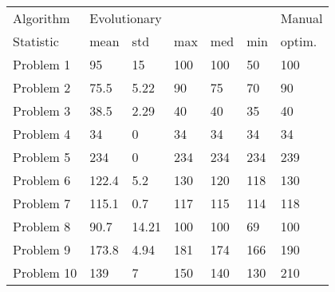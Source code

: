 \begin{tabular}{lllllll}
\toprule
Algorithm & \multicolumn{5}{l}{Evolutionary} & Manual \\
Statistic &         mean &    std &  max &  med &  min & optim. \\
\midrule
Problem 1  &           95 &     15 &  100 &  100 &   50 &    100 \\
Problem 2  &         75.5 &   5.22 &   90 &   75 &   70 &     90 \\
Problem 3  &         38.5 &   2.29 &   40 &   40 &   35 &     40 \\
Problem 4  &           34 &      0 &   34 &   34 &   34 &     34 \\
Problem 5  &          234 &      0 &  234 &  234 &  234 &    239 \\
Problem 6  &        122.4 &    5.2 &  130 &  120 &  118 &    130 \\
Problem 7  &        115.1 &    0.7 &  117 &  115 &  114 &    118 \\
Problem 8  &         90.7 &  14.21 &  100 &  100 &   69 &    100 \\
Problem 9  &        173.8 &   4.94 &  181 &  174 &  166 &    190 \\
Problem 10 &          139 &      7 &  150 &  140 &  130 &    210 \\
\bottomrule
\end{tabular}
